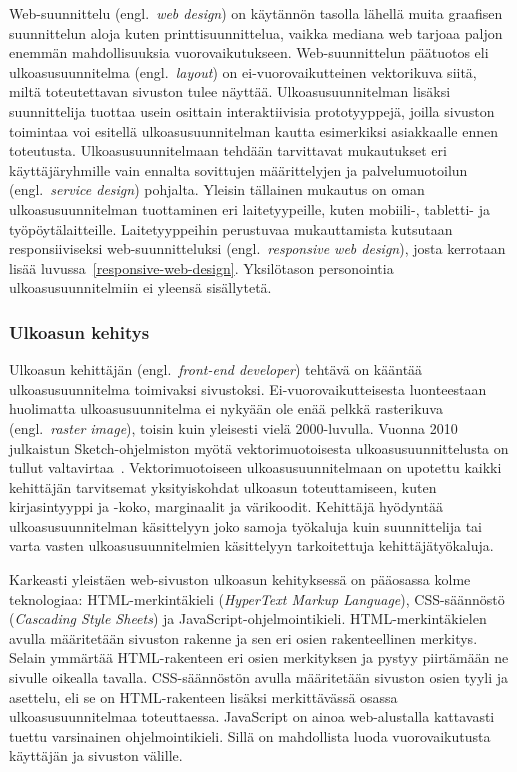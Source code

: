\documentclass[finnish, 12pt, a4paper, elec, utf8, a-1b, online]{aaltothesis}
\begin{document}
Web-suunnittelu (engl.~\textit{web design}) on käytännön tasolla lähellä muita
graafisen suunnittelun aloja kuten printtisuunnittelua, vaikka mediana web
tarjoaa paljon enemmän mahdollisuuksia vuorovaikutukseen. Web-suunnittelun
päätuotos eli ulkoasusuunnitelma (engl.~\textit{layout}) on ei-vuorovaikutteinen
vektorikuva siitä, miltä toteutettavan sivuston tulee näyttää.
Ulkoasusuunnitelman lisäksi suunnittelija tuottaa usein osittain interaktiivisia
prototyyppejä, joilla sivuston toimintaa voi esitellä ulkoasusuunnitelman kautta
esimerkiksi asiakkaalle ennen toteutusta. Ulkoasusuunnitelmaan tehdään
tarvittavat mukautukset eri käyttäjäryhmille vain ennalta sovittujen
määrittelyjen ja palvelumuotoilun (engl.~\textit{service design}) pohjalta.
Yleisin tällainen mukautus on oman ulkoasusuunnitelman tuottaminen eri
laitetyypeille, kuten mobiili-, tabletti- ja työpöytälaitteille. Laitetyyppeihin
perustuvaa mukauttamista kutsutaan responsiiviseksi web-suunnitteluksi
(engl.~\textit{responsive web design}), josta kerrotaan lisää
luvussa~\ref{responsive-web-design}. Yksilötason personointia
ulkoasusuunnitelmiin ei yleensä sisällytetä.

\subsubsection{Ulkoasun kehitys}

Ulkoasun kehittäjän (engl.~\textit{front-end developer}) tehtävä on kääntää
ulkoasusuunnitelma toimivaksi sivustoksi. Ei-vuorovaikutteisesta luonteestaan
huolimatta ulkoasusuunnitelma ei nykyään ole enää pelkkä rasterikuva
(engl.~\textit{raster image}), toisin kuin yleisesti vielä 2000-luvulla. Vuonna
2010 julkaistun Sketch-ohjelmiston myötä vektorimuotoisesta
ulkoasusuunnittelusta on tullut valtavirtaa~\cite{webdesignmuseum_2022}.
Vektorimuotoiseen ulkoasusuunnitelmaan on upotettu kaikki kehittäjän tarvitsemat
yksityiskohdat ulkoasun toteuttamiseen, kuten kirjasintyyppi ja -koko,
marginaalit ja värikoodit. Kehittäjä hyödyntää ulkoasusuunnitelman käsittelyyn
joko samoja työkaluja kuin suunnittelija tai varta vasten ulkoasusuunnitelmien
käsittelyyn tarkoitettuja kehittäjätyökaluja.

Karkeasti yleistäen web-sivuston ulkoasun kehityksessä on pääosassa kolme
teknologiaa: HTML-merkintäkieli (\textit{HyperText Markup Language}),
CSS-säännöstö (\textit{Cascading Style Sheets}) ja JavaScript-ohjelmointikieli.
HTML-merkintäkielen avulla määritetään sivuston rakenne ja sen eri osien
rakenteellinen merkitys. Selain ymmärtää HTML-rakenteen eri osien merkityksen ja
pystyy piirtämään ne sivulle oikealla tavalla. CSS-säännöstön avulla määritetään
sivuston osien tyyli ja asettelu, eli se on HTML-rakenteen lisäksi merkittävässä
osassa ulkoasusuunnitelmaa toteuttaessa. JavaScript on ainoa web-alustalla
kattavasti tuettu varsinainen ohjelmointikieli. Sillä on mahdollista luoda
vuorovaikutusta käyttäjän ja sivuston välille.
\end{document}
